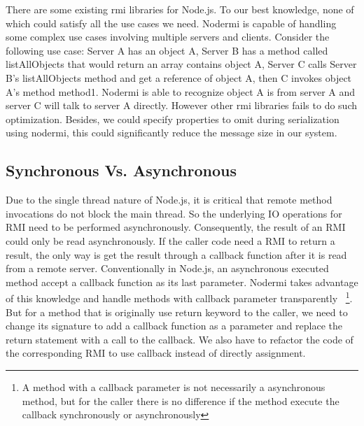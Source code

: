 There are some existing rmi libraries for Node.js. 
To our best knowledge, none of which could satisfy all the use cases we need.
Nodermi is capable of handling some complex use cases involving multiple servers and clients.
Consider the following use case:
Server A has an object A, 
Server B has a method called listAllObjects that would return an array contains object A,
Server C calls Server B's listAllObjects method and get a reference of object A,
then C invokes object A's method method1.
Nodermi is able to recognize object A is from server A and server C will talk to server A directly.
However other rmi libraries fails to do such optimization.
Besides, we could specify properties to omit during serialization using nodermi, 
this could significantly reduce the message size in our system.

\subsection{Synchronous Vs. Asynchronous}
Due to the single thread nature of Node.js, 
it is critical that remote method invocations do not block the main thread.
So the underlying IO operations for RMI need to be performed asynchronously.
Consequently, the result of an RMI could only be read asynchronously.
If the caller code need a RMI to return a result,
the only way is get the result through a callback function 
after it is read from a remote server.
Conventionally in Node.js, an asynchronous executed method 
accept a callback function as its last parameter.
Nodermi takes advantage of this knowledge and handle methods with callback parameter transparently
~\footnote{A method with a callback parameter is not necessarily a asynchronous method, 
but for the caller there is no difference if the method execute the callback synchronously or asynchronously}.
But for a method that is originally use return keyword to the caller, 
we need to change its signature to add a callback function as a parameter and 
replace the return statement with a call to the callback. %
We also have to refactor the code of the corresponding RMI to use callback instead of 
directly assignment.

